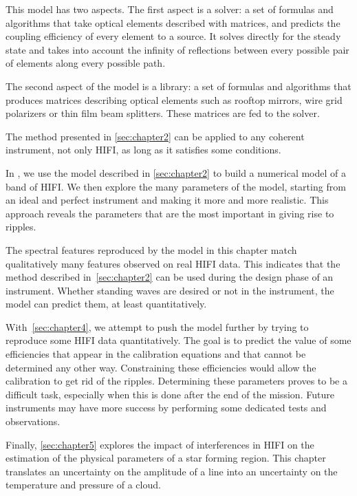 This model has two aspects.
The first aspect is a solver: a set of formulas and algorithms that take optical elements described with matrices, and predicts the coupling efficiency of every element to a source.
It solves directly for the steady state and takes into account the infinity of reflections between every possible pair of elements along every possible path.

The second aspect of the model is a library: a set of formulas and algorithms that produces matrices describing optical elements such as rooftop mirrors, wire grid polarizers or thin film beam splitters.
These matrices are fed to the solver.

The method presented in \cref{sec:chapter2} can be applied to any coherent instrument, not only HIFI, as long as it satisfies some conditions.

In , we use the model described in \cref{sec:chapter2} to build a numerical model of a band of HIFI.
We then explore the many parameters of the model, starting from an ideal and perfect instrument and making it more and more realistic.
This approach reveals the parameters that are the most important in giving rise to ripples.

The spectral features reproduced by the model in this chapter match qualitatively many features observed on real HIFI data.
This indicates that the method described in~\cref{sec:chapter2} can be used during the design phase of an instrument.
Whether standing waves are desired or not in the instrument, the model can predict them, at least quantitatively.

With~\cref{sec:chapter4}, we attempt to push the model further by trying to reproduce some HIFI data quantitatively.
The goal is to predict the value of some efficiencies that appear in the calibration equations and that cannot be determined any other way.
Constraining these efficiencies would allow the calibration to get rid of the ripples.
Determining these parameters proves to be a difficult task, especially when this is done after the end of the mission.
Future instruments may have more success by performing some dedicated tests and observations.

Finally, \cref{sec:chapter5} explores the impact of interferences in HIFI on the estimation of the physical parameters of a star forming region.
This chapter translates an uncertainty on the amplitude of a line into an uncertainty on the temperature and pressure of a cloud.





